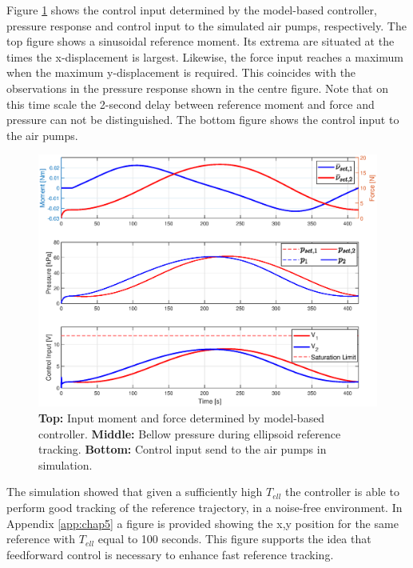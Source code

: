 Figure \ref{fig5:controlinputellipssim} shows the control input determined by the model-based controller, pressure response and control input to the simulated air pumps, respectively. The top figure shows a sinusoidal reference moment. Its extrema are situated at the times the x-displacement is largest. Likewise, the force input reaches a maximum when the maximum y-displacement is required. This coincides with the observations in the pressure response shown in the centre figure. Note that on this time scale the 2-second delay between reference moment and force and pressure can not be distinguished. The bottom figure shows the control input to the air pumps.

\newpage

\begin{figure}[H]
    \centering
    \includegraphics[width = \textwidth]{Figures/Chapter5/controlinputellipssim.eps}
    \caption{\textbf{Top:} Input moment and force determined by model-based controller. \textbf{Middle:} Bellow pressure during ellipsoid reference tracking. \textbf{Bottom:} Control input send to the air pumps in simulation.}
    \label{fig5:controlinputellipssim}
\end{figure}

The simulation showed that given a sufficiently high $T_{ell}$ the controller is able to perform good tracking of the reference trajectory, in a noise-free environment. In Appendix \ref{app:chap5} a figure is provided showing the x,y position for the same reference with $T_{ell}$ equal to 100 seconds. This figure supports the idea that feedforward control is necessary to enhance fast reference tracking.

